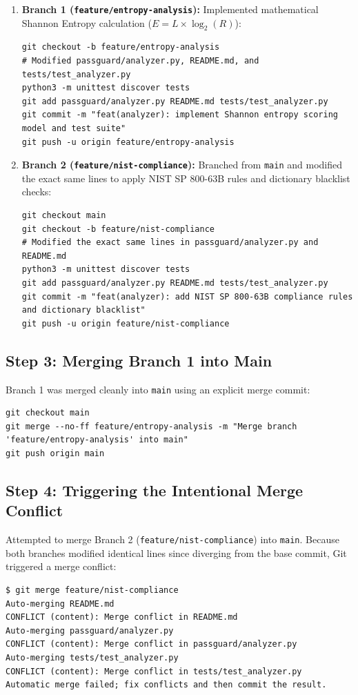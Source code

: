 \documentclass[11pt,a4paper]{article}
\begin{document}
\begin{enumerate}
    \item \textbf{Branch 1 (\texttt{feature/entropy-analysis}):} Implemented mathematical Shannon Entropy calculation ($E = L \times \log_2(R)$):
\begin{lstlisting}[style=terminal]
git checkout -b feature/entropy-analysis
# Modified passguard/analyzer.py, README.md, and tests/test_analyzer.py
python3 -m unittest discover tests
git add passguard/analyzer.py README.md tests/test_analyzer.py
git commit -m "feat(analyzer): implement Shannon entropy scoring model and test suite"
git push -u origin feature/entropy-analysis
\end{lstlisting}

    \item \textbf{Branch 2 (\texttt{feature/nist-compliance}):} Branched from \texttt{main} and modified the exact same lines to apply NIST SP 800-63B rules and dictionary blacklist checks:
\begin{lstlisting}[style=terminal]
git checkout main
git checkout -b feature/nist-compliance
# Modified the exact same lines in passguard/analyzer.py and README.md
python3 -m unittest discover tests
git add passguard/analyzer.py README.md tests/test_analyzer.py
git commit -m "feat(analyzer): add NIST SP 800-63B compliance rules and dictionary blacklist"
git push -u origin feature/nist-compliance
\end{lstlisting}
\end{enumerate}

\subsection{Step 3: Merging Branch 1 into Main}
Branch 1 was merged cleanly into \texttt{main} using an explicit merge commit:
\begin{lstlisting}[style=terminal]
git checkout main
git merge --no-ff feature/entropy-analysis -m "Merge branch 'feature/entropy-analysis' into main"
git push origin main
\end{lstlisting}

\subsection{Step 4: Triggering the Intentional Merge Conflict}
Attempted to merge Branch 2 (\texttt{feature/nist-compliance}) into \texttt{main}. Because both branches modified identical lines since diverging from the base commit, Git triggered a merge conflict:
\begin{lstlisting}[style=terminal]
$ git merge feature/nist-compliance
Auto-merging README.md
CONFLICT (content): Merge conflict in README.md
Auto-merging passguard/analyzer.py
CONFLICT (content): Merge conflict in passguard/analyzer.py
Auto-merging tests/test_analyzer.py
CONFLICT (content): Merge conflict in tests/test_analyzer.py
Automatic merge failed; fix conflicts and then commit the result.
\end{lstlisting}
\end{document}
